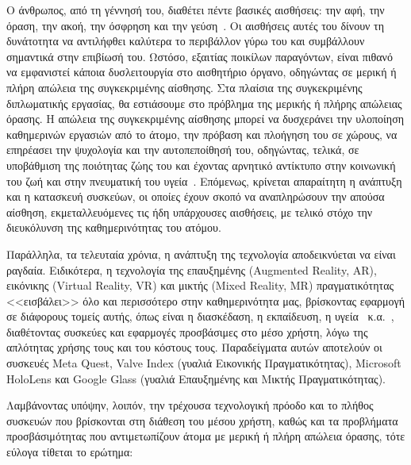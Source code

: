 
\setlength{\parindent}{24pt}
Ο άνθρωπος, από τη γέννησή του, διαθέτει πέντε βασικές αισθήσεις: την αφή, την όραση, την ακοή, την όσφρηση και την γεύση~\cite{bradford_2017_the}. Οι αισθήσεις αυτές του δίνουν τη δυνάτοτητα να αντιλήφθει καλύτερα το περιβάλλον γύρω του και συμβάλλουν σημαντικά στην επιβίωσή του. Ωστόσο, εξαιτίας ποικίλων παραγόντων, είναι πιθανό να εμφανιστεί κάποια δυσλειτουργία στο αισθητήριο όργανο, οδηγώντας σε μερική ή πλήρη απώλεια της συγκεκριμένης αίσθησης. Στα πλαίσια της συγκεκριμένης διπλωματικής εργασίας, θα εστιάσουμε στο πρόβλημα της μερικής ή πλήρης απώλειας όρασης. Η απώλεια της συγκεκριμένης αίσθησης μπορεί να δυσχεράνει την υλοποίηση καθημερινών εργασιών από το άτομο, την πρόβαση και πλοήγηση του σε χώρους, να επηρέασει την ψυχολογία και την αυτοπεποίθησή του, οδηγώντας, τελικά, σε υποβάθμιση της ποιότητας ζώης του και έχοντας αρνητικό αντίκτυπο στην κοινωνική του ζωή και στην πνευματική του υγεία~\cite{worldhealthorganization_2023_blindness}\cite{maaikelangelaan_2007_quality}. Επόμενως, κρίνεται απαραίτητη η ανάπτυξη και η κατασκευή συσκεύων, οι οποίες έχουν σκοπό να αναπληρώσουν την απούσα αίσθηση, εκμεταλλευόμενες τις ήδη υπάρχουσες αισθήσεις, με τελικό στόχο την διευκόλυνση της καθημερινότητας του ατόμου.

Παράλληλα, τα τελευταία χρόνια, η ανάπτυξη της τεχνολογία αποδεικνύεται να είναι ραγδαία. Ειδικότερα, η τεχνολογία της επαυξημένης (Augmented Reality, AR), εικόνικης (Virtual Reality, VR) και μικτής (Mixed Reality, MR) πραγματικότητας <<εισβάλει>> όλο και περισσότερο στην καθημερινότητα μας, βρίσκοντας εφαρμογή σε διάφορους τομείς αυτής, όπως είναι η διασκέδαση, η εκπαίδευση, η υγεία~\cite{morgan_2021_the} κ.α.~\cite{wikipediacontributors_2019_mixed}, διαθέτοντας συσκεύες και εφαρμογές προσβάσιμες στο μέσο χρήστη, λόγω της απλότητας χρήσης τους και του κόστους τους. Παραδείγματα αυτών αποτελούν οι συσκευές Meta Quest, Valve Index (γυαλιά Εικονικής Πραγματικότητας), Microsoft HoloLens και Google Glass (γυαλιά Επαυξημένης και Μικτής Πραγματικότητας). %

Λαμβάνοντας υπόψην, λοιπόν, την τρέχουσα τεχνολογική πρόοδο και το πλήθος συσκευών που βρίσκονται στη διάθεση του μέσου χρήστη, καθώς και τα προβλήματα προσβάσιμότητας που αντιμετωπίζουν άτομα με μερική ή πλήρη απώλεια όρασης, τότε εύλογα τίθεται το ερώτημα:


